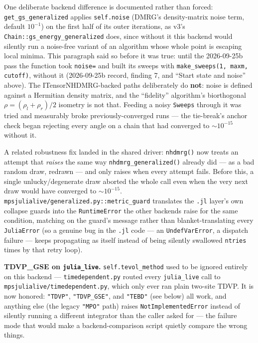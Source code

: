 \documentclass[11pt]{article}
\begin{document}
One deliberate backend difference is documented rather than forced:
\lstinline|get_gs_generalized| applies \lstinline|self.noise| (DMRG's
density-matrix noise term, default $10^{-1}$) on the first half of its
outer iterations, as v3's \lstinline|Chain::gs_energy_generalized| does,
since without it this backend would silently run a noise-free variant of
an algorithm whose whole point is escaping local minima. This paragraph
said so before it was true: until the 2026-09-25b pass the function took
\lstinline|noise=| and built its sweeps with
\lstinline|make_sweeps(1, maxm, cutoff)|, without it (2026-09-25b record,
finding 7, and ``Start state and noise'' above). The ITensorNHDMRG-backed paths deliberately do
\textbf{not}: noise is defined against a Hermitian density matrix, and
the ``fidelity'' algorithm's biorthogonal $\rho=(\rho_l+\rho_r)/2$
isometry is not that. Feeding a noisy \lstinline|Sweeps| through it was
tried and measurably broke previously-converged runs --- the tie-break's
anchor check began rejecting every angle on a chain that had converged to
$\sim10^{-15}$ without it.

A related robustness fix landed in the shared driver:
\lstinline|nhdmrg()| now treats an attempt that \emph{raises} the same way
\lstinline|nhdmrg_generalized()| already did --- as a bad random draw,
redrawn --- and only raises when every attempt fails. Before this, a
single unlucky/degenerate draw aborted the whole call even when the very
next draw would have converged to $\sim10^{-15}$.
\lstinline|mpsjulialive/generalized.py::metric_guard| translates the
\texttt{.jl} layer's own collapse guards into the
\lstinline|RuntimeError| the other backends raise for the same condition,
matching on the guard's message rather than blanket-translating every
\lstinline|JuliaError| (so a genuine bug in the \texttt{.jl} code --- an
\lstinline|UndefVarError|, a dispatch failure --- keeps propagating as
itself instead of being silently swallowed \lstinline|ntries| times by
that retry loop).

\textbf{TDVP\_GSE on \lstinline|julia_live|.}
\lstinline|self.tevol_method| used to be ignored entirely on this
backend --- \texttt{timedependent.py} routed every
\lstinline|julia_live| call to \texttt{mpsjulialive/timedependent.py},
which only ever ran plain two-site TDVP. It is now honored:
\lstinline|"TDVP"|, \lstinline|"TDVP_GSE"|, and \lstinline|"TEBD"| (see
below) all work, and anything else (the legacy \lstinline|"MPO"| path)
raises \lstinline|NotImplementedError| instead of silently running a
different integrator than the caller asked for --- the failure mode that
would make a backend-comparison script quietly compare the wrong things.
\end{document}
